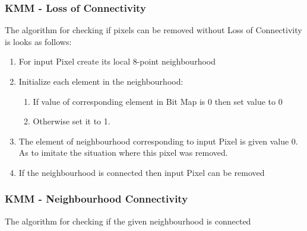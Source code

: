 \documentclass{article}
\begin{document}
\subsubsection{KMM - Loss of Connectivity}

The algorithm for checking if pixels can be removed without Loss of Connectivity is looks as follows:

\begin{enumerate}
	\item For input Pixel create its local 8-point neighbourhood
	\item Initialize each element in the neighbourhood:
	\begin{enumerate}
		\item If value of corresponding element in Bit Map is 0 then set value to 0
		\item Otherwise set it to 1.
	\end{enumerate}
	\item The element of neighbourhood corresponding to input Pixel is given value 0. As to imitate the situation where this pixel was removed.
	
	\item If the neighbourhood is connected then input Pixel can be removed
\end{enumerate}

\subsubsection{KMM - Neighbourhood Connectivity}

The algorithm for checking if the given neighbourhood is connected
\end{document}

